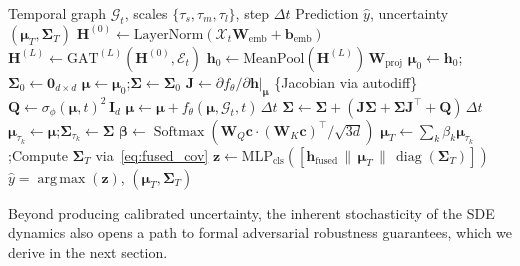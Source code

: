 \documentclass[journal]{IEEEtran}
\newcommand{\G}{\mathcal{G}}
\newcommand{\X}{\mathcal{X}}
\newcommand{\Softmax}{\operatorname{Softmax}}
\DeclareMathOperator*{\argmax}{arg\,max}
\DeclareMathOperator{\diag}{diag}
\begin{document}
\begin{algorithm}[!t]
\caption{SDE-TGNN Forward Pass with Fokker-Planck Uncertainty}
\label{alg:inference}
\begin{algorithmic}[1]
\REQUIRE Temporal graph $\G_t$, scales $\{\tau_s, \tau_m, \tau_l\}$, step $\Delta t$
\ENSURE Prediction $\hat{y}$, uncertainty $(\boldsymbol{\mu}_T, \boldsymbol{\Sigma}_T)$
\STATE $\mathbf{H}^{(0)} \leftarrow \mathrm{LayerNorm}(\X_t \mathbf{W}_{\mathrm{emb}} + \mathbf{b}_{\mathrm{emb}})$
\STATE $\mathbf{H}^{(L)} \leftarrow \mathrm{GAT}^{(L)}(\mathbf{H}^{(0)}, \mathcal{E}_t)$
\STATE $\mathbf{h}_0 \leftarrow \mathrm{MeanPool}(\mathbf{H}^{(L)})\,\mathbf{W}_{\mathrm{proj}}$
\STATE $\boldsymbol{\mu}_0 \leftarrow \mathbf{h}_0$;\quad $\boldsymbol{\Sigma}_0 \leftarrow \mathbf{0}_{d \times d}$
    \STATE $\boldsymbol{\mu} \leftarrow \boldsymbol{\mu}_0$;\quad $\boldsymbol{\Sigma} \leftarrow \boldsymbol{\Sigma}_0$
        \STATE $\mathbf{J} \leftarrow \partial f_\theta / \partial \mathbf{h}\big|_{\boldsymbol{\mu}}$ \hfill \{Jacobian via autodiff\}
        \STATE $\mathbf{Q} \leftarrow \sigma_\phi(\boldsymbol{\mu}, t)^2 \, \mathbf{I}_d$
        \STATE $\boldsymbol{\mu} \leftarrow \boldsymbol{\mu} + f_\theta(\boldsymbol{\mu}, \G_t, t)\,\Delta t$
        \STATE $\boldsymbol{\Sigma} \leftarrow \boldsymbol{\Sigma} + (\mathbf{J}\boldsymbol{\Sigma} + \boldsymbol{\Sigma}\mathbf{J}^\top + \mathbf{Q})\,\Delta t$
    \ENDFOR
    \STATE $\boldsymbol{\mu}_{\tau_k} \leftarrow \boldsymbol{\mu}$;\quad $\boldsymbol{\Sigma}_{\tau_k} \leftarrow \boldsymbol{\Sigma}$
\ENDFOR
\STATE $\boldsymbol{\beta} \leftarrow \Softmax(\mathbf{W}_Q \mathbf{c} \cdot (\mathbf{W}_K \mathbf{c})^\top / \sqrt{3d})$
\STATE $\boldsymbol{\mu}_T \leftarrow \sum_k \beta_k \boldsymbol{\mu}_{\tau_k}$;\quad Compute $\boldsymbol{\Sigma}_T$ via~\eqref{eq:fused_cov}
\STATE $\mathbf{z} \leftarrow \mathrm{MLP}_{\mathrm{cls}}([\mathbf{h}_{\mathrm{fused}} \,\|\, \boldsymbol{\mu}_T \,\|\, \diag(\boldsymbol{\Sigma}_T)])$
\RETURN $\hat{y} = \argmax(\mathbf{z})$, $(\boldsymbol{\mu}_T, \boldsymbol{\Sigma}_T)$
\end{algorithmic}
\end{algorithm}

Beyond producing calibrated uncertainty, the inherent stochasticity of the SDE dynamics also opens a path to formal adversarial robustness guarantees, which we derive in the next section.


\end{document}
